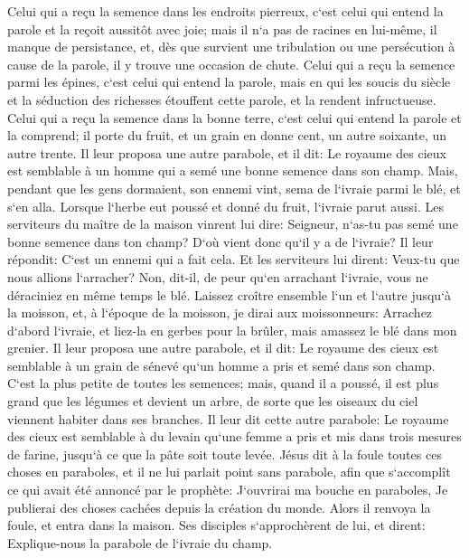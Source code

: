 \verse Celui qui a reçu la semence dans les endroits pierreux, c`est celui qui entend la parole et la reçoit aussitôt avec joie; 
\verse mais il n`a pas de racines en lui-même, il manque de persistance, et, dès que survient une tribulation ou une persécution à cause de la parole, il y trouve une occasion de chute. 
\verse Celui qui a reçu la semence parmi les épines, c`est celui qui entend la parole, mais en qui les soucis du siècle et la séduction des richesses étouffent cette parole, et la rendent infructueuse. 
\verse Celui qui a reçu la semence dans la bonne terre, c`est celui qui entend la parole et la comprend; il porte du fruit, et un grain en donne cent, un autre soixante, un autre trente. 
\verse Il leur proposa une autre parabole, et il dit: Le royaume des cieux est semblable à un homme qui a semé une bonne semence dans son champ. 
\verse Mais, pendant que les gens dormaient, son ennemi vint, sema de l`ivraie parmi le blé, et s`en alla. 
\verse Lorsque l`herbe eut poussé et donné du fruit, l`ivraie parut aussi. 
\verse Les serviteurs du maître de la maison vinrent lui dire: Seigneur, n`as-tu pas semé une bonne semence dans ton champ? D`où vient donc qu`il y a de l`ivraie? 
\verse Il leur répondit: C`est un ennemi qui a fait cela. Et les serviteurs lui dirent: Veux-tu que nous allions l`arracher? 
\verse Non, dit-il, de peur qu`en arrachant l`ivraie, vous ne déraciniez en même temps le blé. 
\verse Laissez croître ensemble l`un et l`autre jusqu`à la moisson, et, à l`époque de la moisson, je dirai aux moissonneurs: Arrachez d`abord l`ivraie, et liez-la en gerbes pour la brûler, mais amassez le blé dans mon grenier. 
\verse Il leur proposa une autre parabole, et il dit: Le royaume des cieux est semblable à un grain de sénevé qu`un homme a pris et semé dans son champ. 
\verse C`est la plus petite de toutes les semences; mais, quand il a poussé, il est plus grand que les légumes et devient un arbre, de sorte que les oiseaux du ciel viennent habiter dans ses branches. 
\verse Il leur dit cette autre parabole: Le royaume des cieux est semblable à du levain qu`une femme a pris et mis dans trois mesures de farine, jusqu`à ce que la pâte soit toute levée. 
\verse Jésus dit à la foule toutes ces choses en paraboles, et il ne lui parlait point sans parabole, 
\verse afin que s`accomplît ce qui avait été annoncé par le prophète: J`ouvrirai ma bouche en paraboles, Je publierai des choses cachées depuis la création du monde. 
\verse Alors il renvoya la foule, et entra dans la maison. Ses disciples s`approchèrent de lui, et dirent: Explique-nous la parabole de l`ivraie du champ. 
